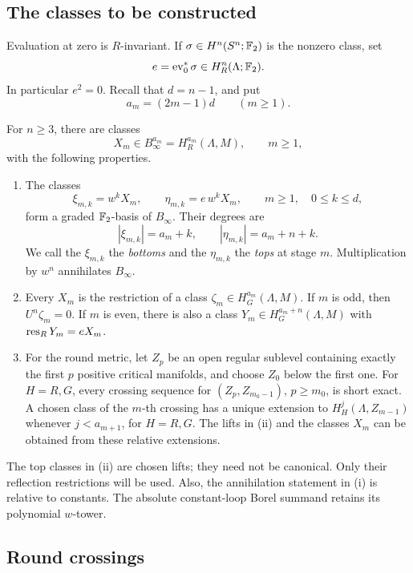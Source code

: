 \subsection{The classes to be constructed}

Evaluation at zero is \(R\)-invariant.  If
\(\sigma\in H^n(S^n;\mathbb F_2)\) is the nonzero class, set
\[
 e=\operatorname{ev}_0^*\sigma\in H_R^n(\Lambda;\mathbb F_2).
\]
In particular \(e^2=0\).  Recall that \(d=n-1\), and put
\[
 a_m=(2m-1)d\qquad(m\ge1).
\]

\begin{theorem}
\label{thm:global-generators}
For \(n\ge3\), there are classes
\[
 X_m\in B_\infty^{a_m}=H_R^{a_m}(\Lambda,M),\qquad m\ge1,
\]
with the following properties.
\begin{enumerate}[label=\textup{(\roman*)}]
\item The classes
\[
 \xi_{m,k}=w^kX_m,\qquad
 \eta_{m,k}=e\,w^kX_m,
 \qquad m\ge1,\quad 0\le k\le d,
\]
form a graded \(\mathbb F_2\)-basis of \(B_\infty\).  Their degrees are
\[
 |\xi_{m,k}|=a_m+k,\qquad
 |\eta_{m,k}|=a_m+n+k.
\]
We call the \(\xi_{m,k}\) the \emph{bottoms} and the \(\eta_{m,k}\)
the \emph{tops} at stage \(m\).
Multiplication by \(w^n\) annihilates \(B_\infty\).
\item Every \(X_m\) is the restriction of a class
\(\zeta_m\in H_G^{a_m}(\Lambda,M)\).
If \(m\) is odd, then \(U^n\zeta_m=0\).
If \(m\) is even, there is also a class
\(Y_m\in H_G^{a_m+n}(\Lambda,M)\) with
\(\operatorname{res}_R Y_m=eX_m\).
\item For the round metric, let \(Z_p\) be an open regular sublevel
containing exactly the first \(p\) positive critical manifolds,
and choose \(Z_0\) below the first one.
For \(H=R,G\), every crossing sequence for
\((Z_p,Z_{m_0-1})\), \(p\ge m_0\), is short exact.
A chosen class of the \(m\)-th crossing has a unique extension to
\(H_H^j(\Lambda,Z_{m-1})\) whenever \(j<a_{m+1}\), for
\(H=R,G\).  The lifts in \textup{(ii)} and the classes \(X_m\)
can be obtained from these relative extensions.
\end{enumerate}
\end{theorem}

The top classes in \textup{(ii)} are chosen lifts; they need not be
canonical.  Only their reflection restrictions will be used.
Also, the annihilation statement in \textup{(i)} is relative to
constants.  The absolute constant-loop Borel summand retains its
polynomial \(w\)-tower.

\subsection{Round crossings}

